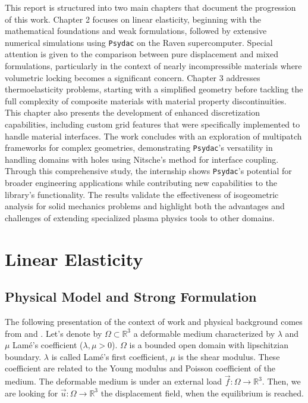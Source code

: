 \documentclass[a4paper,12pt,twoside]{report}
\newcommand{\mtr}{\mathbb{R}}
\begin{document}
This report is structured into two main chapters that document the progression of this work. Chapter 2 focuses on linear elasticity, beginning with the mathematical foundations and weak formulations, followed by extensive numerical simulations using \texttt{Psydac} on the Raven supercomputer. Special attention is given to the comparison between pure displacement and mixed formulations, particularly in the context of nearly incompressible materials where volumetric locking becomes a significant concern. Chapter 3 addresses thermoelasticity problems, starting with a simplified geometry before tackling the full complexity of composite materials with material property discontinuities. This chapter also presents the development of enhanced discretization capabilities, including custom grid features that were specifically implemented to handle material interfaces. The work concludes with an exploration of multipatch frameworks for complex geometries, demonstrating \texttt{Psydac}'s versatility in handling domains with holes using Nitsche's method for interface coupling.\\

Through this comprehensive study, the internship shows \texttt{Psydac}'s potential for broader engineering applications while contributing new capabilities to the library's functionality. The results validate the effectiveness of isogeometric analysis for solid mechanics problems and highlight both the advantages and challenges of extending specialized plasma physics tools to other domains.


\chapter{Linear Elasticity}
\label{chap:linear_elasticity}

\section{Physical Model and Strong Formulation}
The following presentation of the context of work and physical background comes from \cite{gould_introduction_2013} and \cite{ern_theory_2004}.
Let's denote by $\Omega \subset \mtr^3$ a deformable medium characterized by $\lambda$ and $\mu$ Lamé's coefficient ($\lambda, \mu > 0$). $\Omega$ is a bounded open domain with lipschitzian boundary. $\lambda$ is called Lamé's first coefficient, $\mu$ is the shear modulus. These coefficient are related to the Young modulus and Poisson coefficient of the medium. The deformable medium is under an external load $\vec f : \Omega \rightarrow \mtr^3$. Then, we are looking for $\vec u : \Omega \rightarrow \mtr^3$ the displacement field, when the equilibrium is reached. 
\end{document}
